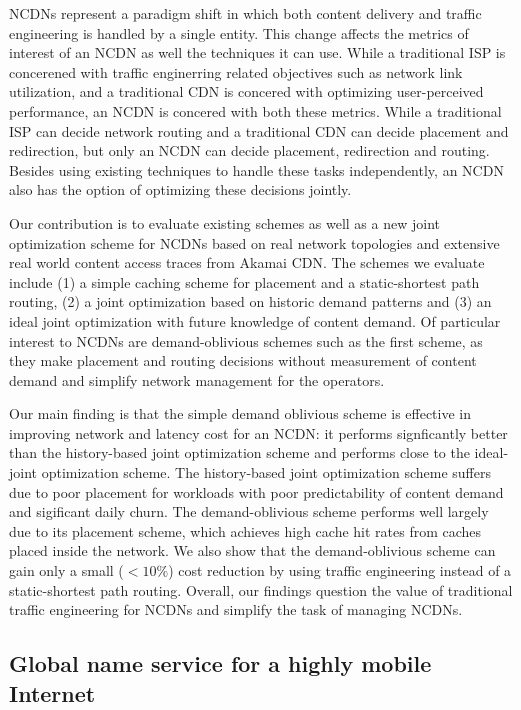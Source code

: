 NCDNs represent a paradigm shift in which both content delivery and traffic engineering is handled by a single entity. This change affects the metrics of interest of an NCDN as well the techniques it can use. While a traditional ISP is concerened with traffic enginerring related objectives such as network link utilization, and a traditional CDN is concered with optimizing user-perceived performance, an NCDN is concered with both these metrics. While a traditional ISP can decide network routing and a traditional CDN can decide placement and redirection, but only an NCDN can decide placement, redirection and routing. Besides using existing techniques to handle these tasks independently, an NCDN also has the option of optimizing these decisions jointly. 

Our contribution is to evaluate existing schemes as well as a new joint optimization scheme for NCDNs based on real network topologies and extensive real world content access traces from Akamai CDN. The schemes we evaluate include (1) a simple caching scheme for placement and a static-shortest path routing, (2) a joint optimization based on historic demand patterns and (3) an ideal joint optimization with future knowledge of content demand. Of particular interest to NCDNs are demand-oblivious schemes such as the first scheme, as they make placement and routing decisions without measurement of content demand and simplify network management for the operators.

Our main finding is that the simple demand oblivious scheme is effective in improving network and latency cost for an NCDN: it performs signficantly better than  the history-based joint optimization scheme and performs close to the ideal-joint optimization scheme. The history-based joint optimization scheme suffers due to poor placement for workloads with poor predictability of content demand and sigificant daily churn. The demand-oblivious scheme performs well largely due to its placement scheme, which achieves high cache hit rates from caches placed inside the network. We also show that the demand-oblivious scheme can gain only a small ($< 10\%$) cost reduction by using traffic engineering instead of a static-shortest path routing. Overall, our findings question the value of traditional traffic engineering for NCDNs and simplify the task of managing NCDNs.

\subsection{Global name service for a highly mobile Internet}
\label{sec:intro-gns}


